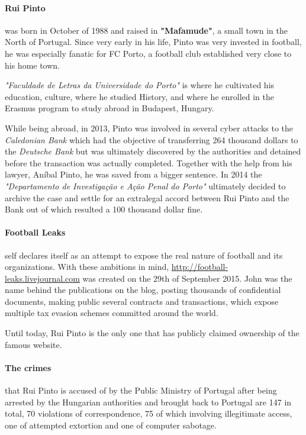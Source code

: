 \paragraph{Rui Pinto}
was born in October of 1988 and raised in \textbf{"Mafamude"}, a small town in the North of Portugal.
Since very early in his life, Pinto was very invested in football, he was especially fanatic for FC Porto, a football club established very close to his home town.

\textit{"Faculdade de Letras da Universidade do Porto"} is where he cultivated his education, culture, where he studied History, and where he enrolled in the Erasmus program to study abroad in Budapest, Hungary.

While being abroad, in 2013, Pinto was involved in several cyber attacks to the \textit{Caledonian Bank} which had the objective of transferring 264 thousand dollars to the \textit{Deutsche Bank} but was ultimately discovered by the authorities and detained before the transaction was actually completed.
Together with the help from his lawyer, Aníbal Pinto, he was saved from a bigger sentence.
In 2014 the \textit{"Departamento de Investigação e Ação Penal do Porto"} ultimately decided to archive the case and settle for an extralegal accord between Rui Pinto and the Bank out of which resulted a 100 thousand dollar fine.

\paragraph{Football Leaks} self declares itself as an attempt to expose the real nature of football and its organizations.
With these ambitions in mind, \url{http://football-leaks.livejournal.com} was created on the 29th of September 2015.
John was the name behind the publications on the blog, posting thousands of confidential documents, making public several contracts and transactions, which expose multiple tax evasion schemes committed around the world.


Until today, Rui Pinto is the only one that has publicly claimed ownership of the famous website.

\paragraph{The crimes} that Rui Pinto is accused of by the Public Ministry of Portugal after being arrested by the Hungarian authorities and brought back to Portugal are 147 in total, 70 violations of correspondence, 75 of which involving illegitimate access, one of attempted extortion and one of computer sabotage.


